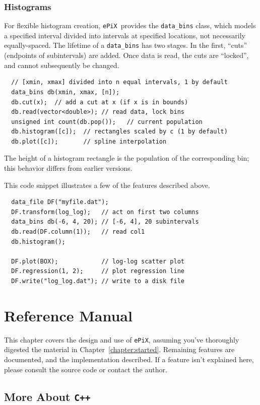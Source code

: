 \documentclass[12pt]{report}
\newcommand{\code}[1]{\texttt{#1}}
\newcommand{\ePiX}{\code{ePiX}}
\newcommand{\CXX}{\code{C++}}
\begin{document}
\subsection*{Histograms}

 For flexible histogram creation, \ePiX\ provides
the \code{data\_bins} class, which models a specified interval divided
into intervals at specified locations, not necessarily
equally-spaced. The lifetime of a \code{data\_bins} has two stages. In
the first, ``cuts'' (endpoints of subintervals) are added. Once data
is read, the cuts are ``locked'', and cannot subsequently be changed.
\begin{verbatim}
  // [xmin, xmax] divided into n equal intervals, 1 by default
  data_bins db(xmin, xmax, [n]);
  db.cut(x);  // add a cut at x (if x is in bounds)
  db.read(vector<double>); // read data, lock bins
  unsigned int count(db.pop());   // current population
  db.histogram([c]);  // rectangles scaled by c (1 by default)
  db.plot([c]);       // spline interpolation
\end{verbatim}
The height of a histogram rectangle is the population of the
corresponding bin; this behavior differs from earlier versions.

This code snippet illustrates a few of the features described above.
\begin{verbatim}
  data_file DF("myfile.dat");
  DF.transform(log_log);   // act on first two columns
  data_bins db(-6, 4, 20); // [-6, 4], 20 subintervals
  db.read(DF.column(1));   // read col1
  db.histogram();

  DF.plot(BOX);            // log-log scatter plot
  DF.regression(1, 2);     // plot regression line
  DF.write("log_log.dat"); // write to a disk file
\end{verbatim}


\chapter{Reference Manual}
\label{chapter:ref-man}

This chapter covers the design and use of \ePiX, assuming you've
thoroughly digested the material in Chapter~\ref{chapter:started}.
Remaining features are documented, and the implementation described.
If a feature isn't explained here, please consult the source code or
contact the author.


\section{More About \CXX}
\end{document}
